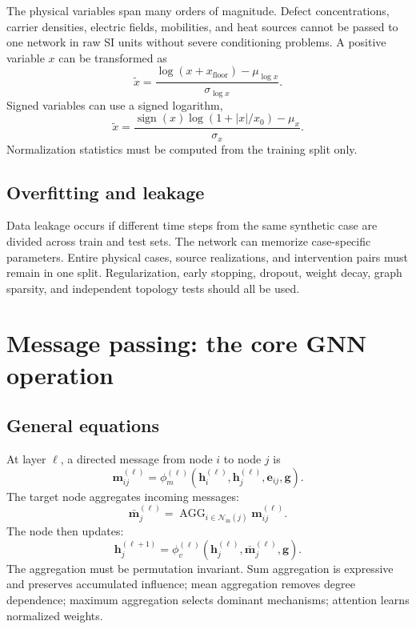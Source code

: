 \documentclass[11pt]{article}
\newcommand{\hvec}{\bm{h}}
\newcommand{\mvec}{\bm{m}}
\newcommand{\evec}{\bm{e}}
\newcommand{\gvec}{\bm{g}}
\newcommand{\Agg}{\operatorname{AGG}}
\begin{document}
The physical variables span many orders of magnitude. Defect concentrations, carrier densities, electric fields, mobilities, and heat sources cannot be passed to one network in raw SI units without severe conditioning problems. A positive variable \(x\) can be transformed as
\begin{equation}
\tilde{x}=\frac{\log(x+x_{\mathrm{floor}})-\mu_{\log x}}{\sigma_{\log x}}.
\end{equation}
Signed variables can use a signed logarithm,
\begin{equation}
\tilde{x}=\frac{\operatorname{sign}(x)\log(1+|x|/x_0)-\mu_x}{\sigma_x}.
\end{equation}
Normalization statistics must be computed from the training split only.

\subsection{Overfitting and leakage}

Data leakage occurs if different time steps from the same synthetic case are divided across train and test sets. The network can memorize case-specific parameters. Entire physical cases, source realizations, and intervention pairs must remain in one split. Regularization, early stopping, dropout, weight decay, graph sparsity, and independent topology tests should all be used.

\section{Message passing: the core GNN operation}

\subsection{General equations}

At layer \(\ell\), a directed message from node \(i\) to node \(j\) is
\begin{equation}
\mvec_{ij}^{(\ell)}
=\phi_m^{(\ell)}\left(
\hvec_i^{(\ell)},
\hvec_j^{(\ell)},
\evec_{ij},
\gvec
\right).
\label{eq:message}
\end{equation}
The target node aggregates incoming messages:
\begin{equation}
\bar{\mvec}_j^{(\ell)}
=\Agg_{i\in\mathcal{N}_{\mathrm{in}}(j)}\mvec_{ij}^{(\ell)}.
\label{eq:aggregation}
\end{equation}
The node then updates:
\begin{equation}
\hvec_j^{(\ell+1)}
=\phi_v^{(\ell)}\left(
\hvec_j^{(\ell)},
\bar{\mvec}_j^{(\ell)},
\gvec
\right).
\label{eq:node_update}
\end{equation}
The aggregation must be permutation invariant. Sum aggregation is expressive and preserves accumulated influence; mean aggregation removes degree dependence; maximum aggregation selects dominant mechanisms; attention learns normalized weights.
\end{document}
